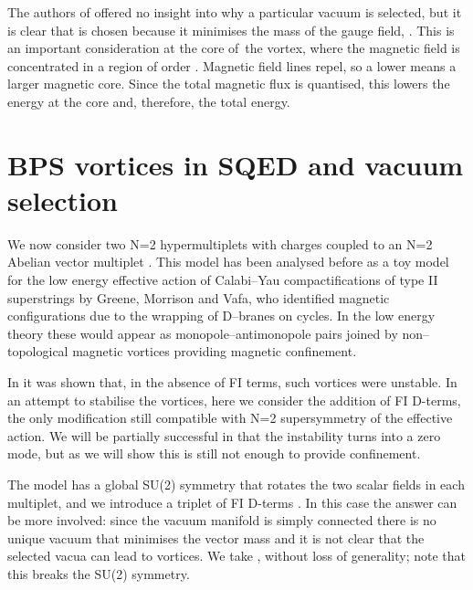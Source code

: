 \documentclass[a4paper,aps,prd,superscriptaddress,floats]{revtex4}
\begin{document}
The authors of \cite{PRTT96} offered no insight into why a particular
vacuum is selected, but it is clear that \coordHE{} is chosen because
it minimises the mass of the gauge field, \coordHE{}.  This is an important
consideration at the core of~the vortex, where the magnetic field is
concentrated in a region of order \coordHE{}. Magnetic field lines
repel, so a lower \coordHE{} means a larger magnetic core. Since the total
magnetic flux is quantised, this lowers the energy at the core and,
therefore, the total energy.

\section{BPS vortices in \coordHE{} SQED and vacuum selection}

We now consider two N=2 hypermultiplets \coordHE{} with charges
\coordHE{} coupled to an N=2 Abelian vector multiplet \cite{ADH98}.
This model has been analysed before as a toy model for the low energy
effective action of Calabi--Yau compactifications of type II
superstrings by Greene, Morrison and Vafa\cite{GMV96}, who identified
magnetic configurations due to the wrapping of D--branes on cycles.
In the low energy theory these would appear as monopole--antimonopole
pairs joined by non--topological magnetic vortices providing magnetic
confinement.

In \cite{ADH98} it was shown that, in the absence of FI terms, such
vortices were unstable. In an attempt to stabilise the vortices, here
we consider the addition of FI D-terms, the only modification still
compatible with N=2 supersymmetry of the effective action.  We will be
partially successful in that the instability turns into a zero mode,
but as we will show this is still not enough to provide confinement.

The model has a global SU(2) symmetry that rotates the two scalar
fields in each multiplet, and we introduce a triplet of FI D-terms
\coordHE{}. In this case the answer can be more involved:
since the vacuum manifold is simply connected there is no unique
vacuum that minimises the vector mass and it is not clear that the
selected vacua can lead to vortices.  We take \coordHE{}, without loss of generality; note that this breaks the
SU(2) symmetry.
\end{document}
